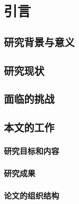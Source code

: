 \chapter{引言}
\label{chap:introduction}

\section{研究背景与意义}
\section{研究现状}
\section{面临的挑战}
\section{本文的工作}
\subsection{研究目标和内容}
\subsection{研究成果}
\subsection{论文的组织结构}
